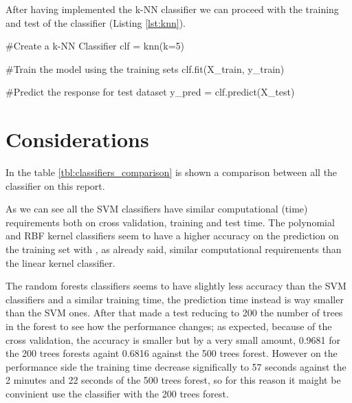 \documentclass[12pt]{article}
\begin{document}
After having implemented the k-NN classifier we can proceed with the training and 
test of the classifier (Listing \ref{lst:knn}).

\begin{python}[caption={k-NN},label={lst:knn}]
#Create a k-NN Classifier
clf = knn(k=5) 

#Train the model using the training sets
clf.fit(X_train, y_train)

#Predict the response for test dataset
y_pred = clf.predict(X_test)
\end{python}

\section{Considerations}

In the table \ref{tbl:classifiers_comparison} is shown a comparison between all the 
classifier on this report.

As we can see all the SVM classifiers have similar computational (time) requirements
both on cross validation, training and test time. The polynomial and RBF kernel 
classifiers seem to have a higher accuracy on the prediction on the training set with 
, as already said, similar computational requirements than the linear kernel 
classifier.

The random forests classifiers seems to have slightly less accuracy than the SVM
classifiers and a similar training time, the prediction time instead is way smaller
than the SVM ones. After that made a test reducing to 200 the number of trees in the 
forest to see how the performance changes; as expected, because of the cross 
validation, the accuracy is smaller but by
a very small amount, 0.9681 for the 200 trees forests againt 0.6816 against the 500 
trees forest. However on the performance side the training time decrease significally
to 57 seconds against the 2 minutes and 22 seconds of the 500 trees forest, so for 
this reason it maight be convinient use the classifier with the 200 trees forest. 
\end{document}
